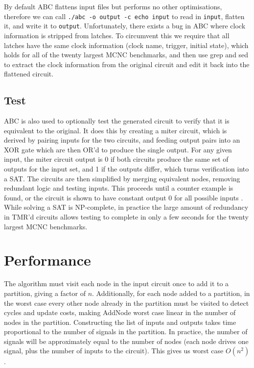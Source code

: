 \documentclass[12pt,final,oneside]{dwThesis} %
\begin{document}
   By default \gls{ABC} flattens input files but performs no other optimisations, therefore we can call
   \texttt{./abc -o output -c echo input} to read in \texttt{input}, flatten it, and write it to \texttt{output}.
   Unfortunately, there exists a bug in \gls{ABC} where clock information is stripped from latches.
   To circumvent this we require that all latches have the same clock information (clock name, trigger, initial state),
   which holds for all of the twenty largest \gls{MCNC} benchmarks,
   and then use grep and sed to extract the clock information from the original circuit and edit it back into the flattened circuit.


   \subsection{Test}
   \label{algTest} \gls{ABC} is also used to optionally test
   the generated circuit to verify that it is equivalent to the original. It
   does this by creating a miter circuit, which is derived by pairing inputs
   for the two circuits, and feeding output pairs into an XOR gate which are
   then OR'd to produce the single output. For any given input, the miter
   circuit output is 0 if both circuits produce the same set of outputs for the
   input set, and 1 if the outputs differ, which turns verification into a
   \gls{SAT}.  The circuits are then simplified by merging equivalent nodes,
   removing redundant logic and testing inputs.
   This proceeds until a counter example is found, or the circuit is shown to
   have constant output 0 for all possible inputs \cite{abcSEC, abcCEC}.  While
   solving a \gls{SAT} is NP-complete, in practice the large amount of
   redundancy in \gls{TMR}'d circuits allows testing to complete in only a few
   seconds for the twenty largest \gls{MCNC} benchmarks.


   \section{Performance}
   The algorithm must visit each node in the input
   circuit once to add it to a partition, giving a factor of $n$.
   Additionally, for each node added to a partition, in the worst case every
   other node already in the partition must be visited to detect cycles and
   update costs, making AddNode worst case linear in the number of nodes in the
   partition.  Constructing the list of inputs and outputs takes time
   proportional to the number of signals in the partition. In practice, the
   number of signals will be approximately equal to the number of nodes (each
   node drives one signal, plus the number of inputs to the circuit).  This
   gives us worst case $O(n^2)$.
   
\end{document}
